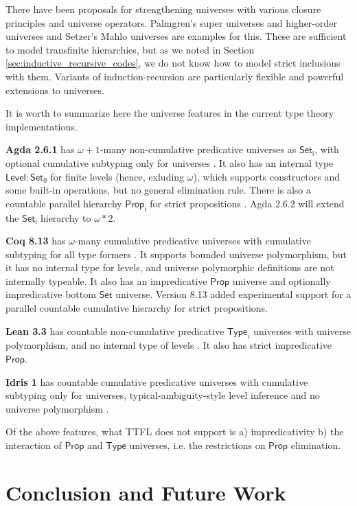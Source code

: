 \documentclass[a4paper,UKenglish,cleveref, autoref, thm-restate]{lipics-v2021}
\theoremstyle{remark}
\theoremstyle{definition}
\newcommand{\Set}[1]{\mathsf{Set_{#1}}}
\newcommand{\Seti}{\mathsf{Set}}
\newcommand{\msf}[1]{\mathsf{#1}}
\begin{document}
There have been proposals for strengthening universes with various closure
principles and universe operators. Palmgren's super universes and higher-order
universes \cite{Palmgren98onuniverses} and Setzer's Mahlo universes
\cite{setzer00mahlo} are examples for this. These are sufficient to model
transfinite hierarchies, but as we noted in Section
\ref{sec:inductive_recursive_codes}, we do not know how to model strict
inclusions with them. Variants of induction-recursion \cite{dybjer99finite,
  indexedir, positiveir} are particularly flexible and powerful extensions to
universes.

It is worth to summarize here the universe features in the current
type theory implementations.

\textbf{Agda 2.6.1} has $\omega+1$-many non-cumulative predicative universes as
$\Set{i}$, with optional cumulative subtyping only for universes
\cite{agdadocs}.  It also has an internal type $\msf{Level} : \Set0$ for finite
levels (hence, exluding $\omega$), which supports constructors and some built-in
operations, but no general elimination rule. There is also a countable parallel
hierarchy $\msf{Prop_i}$ for strict propositions \cite{sprop}. Agda 2.6.2 will
extend the $\Set{i}$ hierarchy to $\omega * 2$.

\textbf{Coq 8.13} has $\omega$-many cumulative predicative universes with
cumulative subtyping for all type formers \cite{timany18cumulative}. It supports
bounded universe polymorphism, but it has no internal type for levels, and
universe polymorphic definitions are not internally typeable. It also has an
impredicative $\msf{Prop}$ universe and optionally impredicative bottom $\Seti$
universe. Version 8.13 added experimental support for a parallel
countable cumulative hierarchy for strict propositions.

\textbf{Lean 3.3} has countable non-cumulative predicative $\msf{Type}_i$
universes with universe polymorphism, and no internal type of levels
\cite{leanmanual}. It also has strict impredicative $\msf{Prop}$.

\textbf{Idris 1} has countable cumulative predicative universes with cumulative
subtyping only for universes, typical-ambiguity-style level inference and no
universe polymorphism \cite{idrisdocs}.

Of the above features, what TTFL does not support is a) impredicativity b) the
interaction of $\msf{Prop}$ and $\msf{Type}$ universes, i.e. the restrictions on
$\msf{Prop}$ elimination.

\section{Conclusion and Future Work} \label{sec:conclusion}
\end{document}
